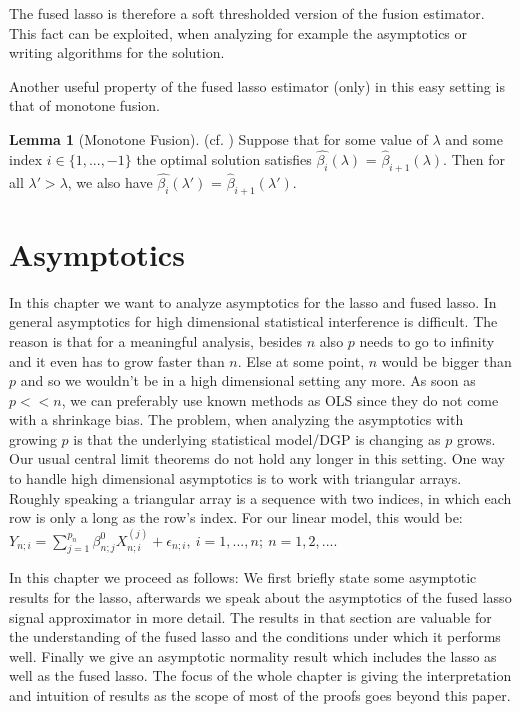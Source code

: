 \documentclass{article}
\theoremstyle{definition}
\newtheorem{lemma}[theorem]{Lemma}
\begin{document}
The fused lasso is therefore a soft thresholded version of the fusion estimator. This fact can be exploited, when analyzing for example the asymptotics or writing algorithms for the solution.
\bigskip
	
Another useful property of the fused lasso estimator (only) in this easy setting is that of monotone fusion.

\begin{lemma}[Monotone Fusion] (cf. \citep{sparsity}) \label{monotone_fusion}
	Suppose that for some value of $\lambda$ and some index $i \in \{1, ..., -1 \}$ the optimal solution satisfies $\hat{\beta_i}(\lambda)$ = $\hat{\beta}_{i+1}(\lambda)$. Then for all $\lambda' > \lambda$, we also have $\hat{\beta_i}(\lambda')$ = $\hat{\beta}_{i+1}(\lambda')$.
\end{lemma}

\section{Asymptotics}

\label{sec:asymptoticslasso}

In this chapter we want to analyze asymptotics for the lasso and fused lasso. In general asymptotics for high dimensional statistical interference is difficult. The reason is that for a meaningful analysis, besides $n$ also $p$ needs to go to infinity and it even has to grow faster than $n$. Else at some point, $n$ would be bigger than $p$ and so we wouldn't be in a high dimensional setting any more. As soon as $p << n$, we can preferably use known methods as OLS since they do not come with a shrinkage bias.  
The problem, when analyzing the asymptotics with growing $p$ is that the underlying statistical model/DGP is changing as $p$ grows. Our usual central limit theorems do not hold any longer in this setting.
One way to handle high dimensional asymptotics is to work with triangular arrays. Roughly speaking a triangular array is a sequence with two indices, in which each row is only a long as the row's index.  For our linear model, this would be: $Y_{n;i}=\sum^{p_n}_{j=1}\beta^0_{n;j}X^{(j)}_{n;i}+\epsilon_{n;i}, \ i=1,...,n; \ n=1,2,...$.   \newline

In this chapter we proceed as follows: We first briefly state some asymptotic results for the lasso, afterwards we speak about the asymptotics of the fused lasso signal approximator in more detail. The results in that section are valuable for the understanding of the fused lasso and the conditions under which it performs well. Finally we give an asymptotic normality result which includes the lasso as well as the fused lasso. The focus of the whole chapter is giving the interpretation and intuition of results as the scope of most of the proofs goes beyond this paper.
\end{document}
